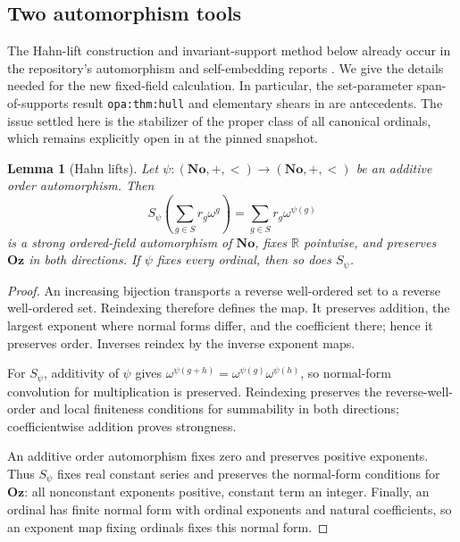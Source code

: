 \documentclass[11pt,a4paper]{article}
\numberwithin{equation}{section}
\newtheorem{lemma}[lemma]{Lemma}
\theoremstyle{definition}
\theoremstyle{remark}
\newcommand{\No}{\mathbf{No}}
\newcommand{\Oz}{\mathbf{Oz}}
\newcommand{\R}{\mathbb R}
\begin{document}
\subsection{Two automorphism tools}

The Hahn-lift construction and invariant-support method below already
occur in the repository's automorphism and self-embedding reports
\cite{RepoOpa,RepoSse}. We give the details needed
for the new fixed-field calculation. In particular, the set-parameter
span-of-supports result \texttt{opa:thm:hull} and elementary shears in
\cite{RepoOpa} are antecedents. The issue settled here is the stabilizer
of the proper class of all canonical ordinals, which remains explicitly
open in \cite{RepoSse} at the pinned snapshot.

\begin{lemma}[Hahn lifts]\label{dsn:rp:lem:hahn-lift}
Let \(\psi:(\No,+,<)\to(\No,+,<)\) be an additive order automorphism.
Then
\begin{equation}\label{dsn:rp:eq:hahn-lift}
 S_\psi\left(\sum_{g\in S}r_g\omega^g\right)
       =\sum_{g\in S}r_g\omega^{\psi(g)}
\end{equation}
is a strong ordered-field automorphism of \(\No\), fixes \(\R\)
pointwise, and preserves \(\Oz\) in both directions. If \(\psi\)
fixes every ordinal, then so does \(S_\psi\).
\end{lemma}

\begin{proof}
An increasing bijection transports a reverse well-ordered set to a
reverse well-ordered set. Reindexing therefore defines the map.
It preserves addition, the largest exponent where normal forms differ,
and the coefficient there; hence it preserves order. Inverses reindex
by the inverse exponent maps.

For \(S_\psi\), additivity of \(\psi\) gives
\(\omega^{\psi(g+h)}=\omega^{\psi(g)}\omega^{\psi(h)}\), so normal-form
convolution for multiplication is preserved. Reindexing preserves the
reverse-well-order and local finiteness conditions for summability in
both directions; coefficientwise addition proves strongness.

An additive order automorphism fixes zero and preserves positive
exponents. Thus \(S_\psi\) fixes real constant series and preserves
the normal-form conditions for \(\Oz\): all nonconstant exponents
positive, constant term an integer. Finally, an ordinal has finite
normal form with ordinal exponents and natural coefficients, so an
exponent map fixing ordinals fixes this normal form.
\end{proof}
\end{document}
